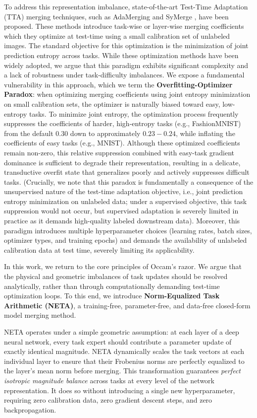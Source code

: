 To address this representation imbalance, state-of-the-art Test-Time Adaptation (TTA) merging techniques, such as AdaMerging \cite{yang2024adamerging} and SyMerge \cite{yu2023symerge}, have been proposed. These methods introduce task-wise or layer-wise merging coefficients which they optimize at test-time using a small calibration set of unlabeled images. The standard objective for this optimization is the minimization of joint prediction entropy across tasks. While these optimization methods have been widely adopted, we argue that this paradigm exhibits significant complexity and a lack of robustness under task-difficulty imbalances. We expose a fundamental vulnerability in this approach, which we term the \textbf{Overfitting-Optimizer Paradox}: when optimizing merging coefficients using joint entropy minimization on small calibration sets, the optimizer is naturally biased toward easy, low-entropy tasks. To minimize joint entropy, the optimization process frequently suppresses the coefficients of harder, high-entropy tasks (e.g., FashionMNIST) from the default $0.30$ down to approximately $0.23 - 0.24$, while inflating the coefficients of easy tasks (e.g., MNIST). Although these optimized coefficients remain non-zero, this relative suppression combined with easy-task gradient dominance is sufficient to degrade their representation, resulting in a delicate, transductive overfit state that generalizes poorly and actively suppresses difficult tasks. (Crucially, we note that this paradox is fundamentally a consequence of the unsupervised nature of the test-time adaptation objective, i.e., joint prediction entropy minimization on unlabeled data; under a supervised objective, this task suppression would not occur, but supervised adaptation is severely limited in practice as it demands high-quality labeled downstream data). Moreover, this paradigm introduces multiple hyperparameter choices (learning rates, batch sizes, optimizer types, and training epochs) and demands the availability of unlabeled calibration data at test time, severely limiting its applicability.

In this work, we return to the core principles of Occam's razor. We argue that the physical and geometric imbalances of task updates should be resolved analytically, rather than through computationally demanding test-time optimization loops. To this end, we introduce \textbf{Norm-Equalized Task Arithmetic (NETA)}, a training-free, parameter-free, and data-free closed-form model merging method. 

NETA operates under a simple geometric assumption: at each layer of a deep neural network, every task expert should contribute a parameter update of exactly identical magnitude. NETA dynamically scales the task vectors at each individual layer to ensure that their Frobenius norms are perfectly equalized to the layer's mean norm before merging. This transformation guarantees \textit{perfect isotropic magnitude balance} across tasks at every level of the network representation. It does so without introducing a single new hyperparameter, requiring zero calibration data, zero gradient descent steps, and zero backpropagation.

